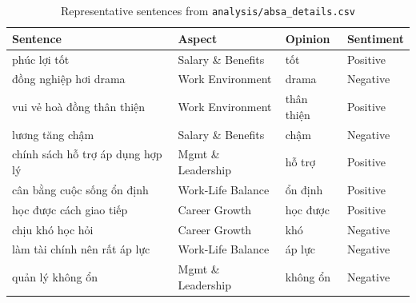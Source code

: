 \documentclass[12pt, a4paper]{article}
\begin{document}
\begin{table}[H]
\centering
\caption{Representative sentences from \texttt{analysis/absa\_details.csv}}
\label{tab:absa_samples}
\begin{tabular}{p{5.5cm} p{3cm} p{2cm} p{1.8cm}}
\toprule
\textbf{Sentence} & \textbf{Aspect} & \textbf{Opinion} & \textbf{Sentiment} \\
\midrule
phúc lợi tốt & Salary \& Benefits & tốt & Positive \\
đồng nghiệp hơi drama & Work Environment & drama & Negative \\
vui vẻ hoà đồng thân thiện & Work Environment & thân thiện & Positive \\
lương tăng chậm & Salary \& Benefits & chậm & Negative \\
chính sách hỗ trợ áp dụng hợp lý & Mgmt \& Leadership & hỗ trợ & Positive \\
cân bằng cuộc sống ổn định & Work-Life Balance & ổn định & Positive \\
học được cách giao tiếp & Career Growth & học được & Positive \\
chịu khó học hỏi & Career Growth & khó & Negative \\
làm tài chính nên rất áp lực & Work-Life Balance & áp lực & Negative \\
quản lý không ổn & Mgmt \& Leadership & không ổn & Negative \\
\bottomrule
\end{tabular}
\end{table}
\end{document}
